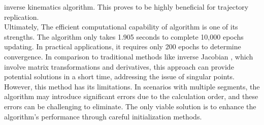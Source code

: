 inverse kinematics algorithm. This proves to be highly beneficial for trajectory replication. \\
Ultimately, The efficient computational capability of algorithm is one of its strengths. The algorithm only 
takes 1.905 seconds to complete 10,000 epochs updating. In practical applications, it requires only 200 epochs 
to determine convergence. In comparison to traditional methods like inverse Jacobian \cite{inverse_jacobian}, 
which involve matrix transformations and derivatives, this approach can provide potential solutions in a short 
time, addressing the issue of singular points. However, this method has its limitations. In scenarios with 
multiple segments, the algorithm may introduce significant errors due to the calculation order, and these errors 
can be challenging to eliminate. The only viable solution is to enhance the algorithm's performance through 
careful initialization methods.
